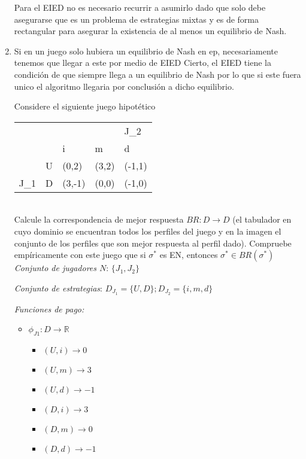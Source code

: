 \documentclass{homework}
\begin{document}
\begin{enumerate}
        Para el EIED no es necesario recurrir a asumirlo dado que solo debe asegurarse que es un problema de estrategias mixtas y es de forma rectangular para asegurar la existencia de al menos un equilibrio de Nash.
        
    \item   Si en un juego solo hubiera un equilibrio de Nash en ep, necesariamente tenemos que llegar a este por medio de EIED
        Cierto, el EIED tiene la condición de que siempre llega a un equilibrio de Nash por lo que si este fuera unico el algoritmo llegaria por conclusión a dicho equilibrio.
    
\newpage
\question Considere el siguiente juego hipotético\\
\begin{tabular}{lllll} 
 &  &  &  & J_2 \\ \cline{3-5} 
 & \multicolumn{1}{l|}{} & \multicolumn{1}{l|}{i} & \multicolumn{1}{l|}{m} & \multicolumn{1}{l|}{d} \\ \cline{2-5} 
\multicolumn{1}{l|}{} & \multicolumn{1}{l|}{U} & \multicolumn{1}{l|}{(0,2)} & \multicolumn{1}{l|}{(3,2)} & \multicolumn{1}{l|}{(-1,1)} \\ \cline{2-5} \multicolumn{1}{l|}{J_1} & \multicolumn{1}{l|}{D} & \multicolumn{1}{l|}{(3,-1)} & \multicolumn{1}{l|}{(0,0)} & \multicolumn{1}{l|}{(-1,0)} \\ \cline{2-5}
\end{tabular}\\

Calcule la correspondencia de mejor respuesta $BR : D \rightarrow D$ (el tabulador en cuyo dominio se encuentran todos los perfiles del juego y en la imagen el conjunto de los perfiles que son mejor respuesta al perfil dado). Compruebe empíricamente con este juego que si $\sigma ^*$ es EN, entonces $\sigma ^* \in BR (\sigma ^* )$\\

\emph{Conjunto de jugadores $N$}: $\{ J_1, J_2 \}$

\emph{Conjunto de estrategias}: $D_{J_1} = \{ U,D \} ;  D_{J_2} = \{ i,m,d \}$

\emph{Funciones de pago: }
        \begin{itemize}
            \item $\phi_{J1} : D \rightarrow \mathbb R$
            \begin{itemize}
                \item $(U,i) \rightarrow 0$
                \item $(U,m) \rightarrow 3$ 
                \item $(U,d) \rightarrow -1$ 
                \item $(D,i) \rightarrow 3$
                \item $(D,m) \rightarrow 0$
                \item $(D,d) \rightarrow -1$
            \end{itemize}\\
            

\end{itemize}
\end{enumerate}
\end{document}

